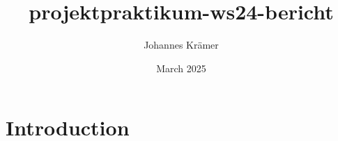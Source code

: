 \documentclass{article}
\title{projektpraktikum-ws24-bericht}
\author{Johannes Krämer}
\date{March 2025}
\begin{document}
\maketitle

\section{Introduction}
\end{document}
